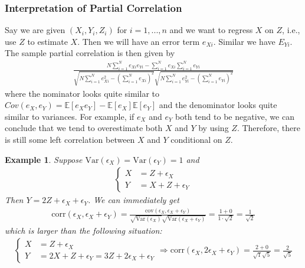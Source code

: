\documentclass[twoside]{article}
\newtheorem*{example*}{Example}
\begin{document}
	\subsubsection{Interpretation of Partial Correlation}
	Say we are given $(X_i,Y_i,Z_i)$ for $i = 1, ..., n$ and we want to regress $X$ on $Z$, i.e., use $Z$ to estimate $X$. Then we will have an error term $e_{Xi}$. Similar we have $E_{Yi}$. The sample partial correlation is then given by
	\begin{align*}
		\frac{N \sum_{i=1}^{N} e_{Xi} e_{Yi} - \sum_{i=1}^{N} e_{Xi} \sum_{i=1}^{N} e_{Yi}}{\sqrt{N \sum_{i=1}^{N} e_{Xi}^2 - \left( \sum_{i=1}^{N} e_{Xi} \right)^2} \sqrt{N \sum_{i=1}^{N} e_{Yi}^2 - \left( \sum_{i=1}^{N} e_{Yi} \right)^2}}
	\end{align*}
	where the nominator looks quite similar to $Cov \left( e_X, e_Y \right) = \mathbb{E} \left[ e_X e_Y \right] - \mathbb{E} \left[ e_X \right] \mathbb{E} \left[ e_Y \right]$ and the denominator looks quite similar to variances. For example, if $e_X$ and $e_Y$ both tend to be negative, we can conclude that we tend to overestimate both $X$ and $Y$ by using $Z$. Therefore, there is still some left correlation between $X$ and $Y$ conditional on $Z$. 
	\begin{example*}
		Suppose $\mathrm{Var}(\epsilon_X) = \mathrm{Var}(\epsilon_Y) = 1$ and 
		\begin{align*}
			\begin{cases}
				X &= Z + \epsilon_X \\
				Y &= X + Z + \epsilon_Y
			\end{cases}
		\end{align*}
		Then $Y = 2 Z + \epsilon_X + \epsilon_Y$. We can immediately get
		\begin{align*}
			\mathrm{corr} (\epsilon_X, \epsilon_X + \epsilon_Y) = \frac{\mathrm{cov}(\epsilon_X, \epsilon_X + \epsilon_Y)}{\sqrt{\mathrm{Var}(\epsilon_X)} \sqrt{\mathrm{Var}(\epsilon_X + \epsilon_Y)}} = \frac{1 + 0}{1 \cdot \sqrt{2}} = \frac{1}{\sqrt{2}}
		\end{align*}
		which is larger than the following situation:
		\begin{align*}
			\begin{cases}
				X &= Z + \epsilon_X \\
				Y &= 2 X + Z + \epsilon_Y = 3Z + 2 \epsilon_X + \epsilon_Y
			\end{cases} \Rightarrow \mathrm{corr} (\epsilon_X, 2 \epsilon_X + \epsilon_Y) = \frac{2+0}{\sqrt{1} \sqrt{5}} = \frac{2}{\sqrt{5}}
		\end{align*}
	\end{example*}
	
\end{document}
